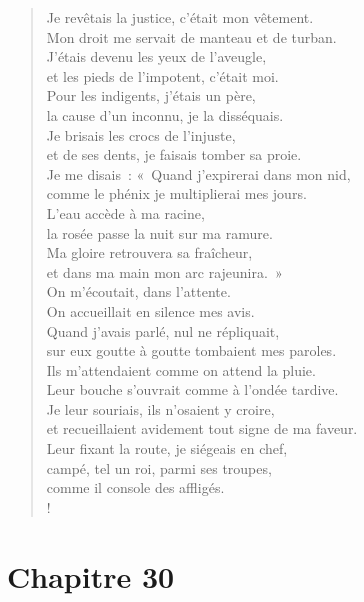 \documentclass[french,twoside]{book} %
\def\mednobreak{\ifdim\lastskip<\medskipamount
  \removelastskip\nopagebreak\medskip\fi}
\newcommand{\labelblock}[1]{\medbreak{\noindent\color{rubric}\bfseries #1}\par\mednobreak}
\newcommand\chapteropen{} %
\newcommand\chaptercont{} %
\newcommand\chapterclose{} %
\begin{document}
\begin{verse}
Je revêtais la justice, c’était mon vêtement. \\
Mon droit me servait de manteau et de turban.\\
J’étais devenu les yeux de l’aveugle, \\
et les pieds de l’impotent, c’était moi.\\
Pour les indigents, j’étais un père, \\
la cause d’un inconnu, je la disséquais.\\
Je brisais les crocs de l’injuste, \\
et de ses dents, je faisais tomber sa proie.\\
Je me disais : « Quand j’expirerai dans mon nid, \\
comme le phénix je multiplierai mes jours.\\
L’eau accède à ma racine, \\
la rosée passe la nuit sur ma ramure.\\
Ma gloire retrouvera sa fraîcheur, \\
et dans ma main mon arc rajeunira. »\\
On m’écoutait, dans l’attente. \\
On accueillait en silence mes avis.\\
Quand j’avais parlé, nul ne répliquait, \\
sur eux goutte à goutte tombaient mes paroles.\\
Ils m’attendaient comme on attend la pluie. \\
Leur bouche s’ouvrait comme à l’ondée tardive.\\
Je leur souriais, ils n’osaient y croire, \\
et recueillaient avidement tout signe de ma faveur.\\
Leur fixant la route, je siégeais en chef, \\
campé, tel un roi, parmi ses troupes, \\
comme il console des affligés.\\!
\end{verse}
\chapterclose


\chapteropen
\chapter[{Chapitre 30}]{Chapitre 30}\renewcommand{\leftmark}{Chapitre 30}


\chaptercont

\labelblock{La misère d’aujourd’hui}
\end{document}

